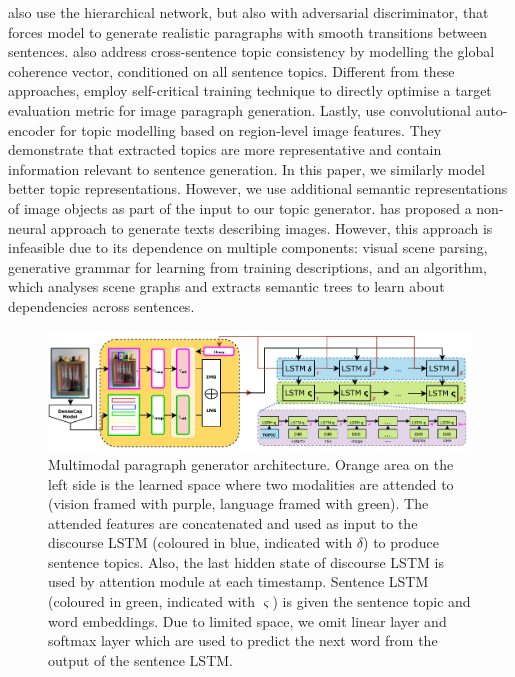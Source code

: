 \documentclass[11pt,a4paper]{article}
\begin{document}

 also use the hierarchical network, but also with adversarial discriminator, that forces model to generate realistic paragraphs with smooth transitions between sentences.
 also address cross-sentence topic consistency by modelling the global coherence vector, conditioned on all sentence topics.
Different from these approaches,  employ self-critical training technique \cite{selfcritical2016} to directly optimise a target evaluation metric for image paragraph generation.
Lastly,  use convolutional auto-encoder for topic modelling based on region-level image features.
They demonstrate that extracted topics are more representative and contain information relevant to sentence generation.
In this paper, we similarly model better topic representations.
However, we use additional semantic representations of image objects as part of the input to our topic generator.
 has proposed a non-neural approach to generate texts describing images.
However, this approach is infeasible due to its dependence on multiple components: visual scene parsing, generative grammar for learning from training descriptions, and an algorithm, which analyses scene graphs and extracts semantic trees to learn about dependencies across sentences.

\begin{figure}[h!]
 \includegraphics[width=\linewidth]{figures/model}
 \caption{Multimodal paragraph generator architecture.
 		Orange area on the left side is the learned space where two modalities are attended to (vision framed with purple, language framed with green).
		The attended features are concatenated and used as input to the discourse LSTM (coloured in blue, indicated with $\delta$) to produce sentence topics.
		Also, the last hidden state of discourse LSTM is used by attention module at each timestamp.
		Sentence LSTM (coloured in green, indicated with $\varsigma$) is given the sentence topic and word embeddings.
		Due to limited space, we omit linear layer and softmax layer which are used to predict the next word from the output of the sentence LSTM.}
 \label{fig:model}
\end{figure}
\end{document}
